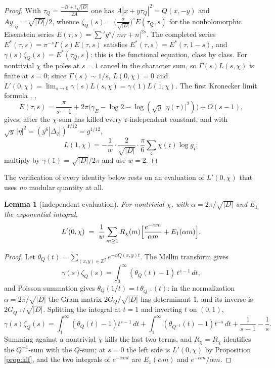 \documentclass[11pt]{amsart}
\numberwithin{equation}{section}
\theoremstyle{plain}
\newtheorem{lemma}[theorem]{Lemma}
\theoremstyle{definition}
\theoremstyle{remark}
\newcommand{\Z}{\mathbb{Z}}
\newcommand{\idealc}{\mathfrak{c}}
\begin{document}
\begin{proof}
With $\tau_Q = \tfrac{-B + i\sqrt{|D|}}{2A}$ one has $A|x + y\tau_Q|^2 =
Q(x,-y)$ and $Ay_{\tau_Q} = \sqrt{|D|}/2$, whence
$\zeta_Q(s) = \bigl(\tfrac{2}{\sqrt{|D|}}\bigr)^{s}E(\tau_Q, s)$ for the
nonholomorphic Eisenstein series $E(\tau,s) = \sum'y^s/|m\tau + n|^{2s}$.
The completed series $E^*(\tau,s) = \pi^{-s}\Gamma(s)E(\tau,s)$ satisfies
$E^*(\tau,s) = E^*(\tau,1-s)$, and $\gamma(s)\zeta_Q(s) = E^*(\tau_Q,s)$:
this is the functional equation, class by class.  For nontrivial $\chi$
the poles at $s = 1$ cancel in the character sum, so $\Gamma(s)L(s,\chi)$
is finite at $s = 0$; since $\Gamma(s) \sim 1/s$, $L(0,\chi) = 0$ and
$L'(0,\chi) = \lim_{s \to 0}\gamma(s)L(s,\chi) = \gamma(1)L(1,\chi)$.  The
first Kronecker limit formula \cite[Ch.~I]{Siegel1961}, \cite[Ch.~20]{Lang1987},
\[
  E(\tau,s) = \frac{\pi}{s-1} + 2\pi\bigl(\gamma_E - \log 2 -
  \log(\sqrt y\,|\eta(\tau)|^2)\bigr) + O(s-1),
\]
gives, after the $\chi$-sum has killed every $\idealc$-independent
constant, and with $\sqrt y\,|\eta|^2 = (y^6|\Delta_q|)^{1/12} =
g^{1/12}$,
\[
  L(1,\chi) = -\frac1w\cdot\frac{2}{\sqrt{|D|}}\cdot\frac{\pi}{6}
  \sum_\idealc\chi(\idealc)\log g_\idealc ;
\]
multiply by $\gamma(1) = \sqrt{|D|}/2\pi$ and use $w = 2$.
\end{proof}

The verification of every identity below rests on an evaluation of
$L'(0,\chi)$ that uses \emph{no} modular quantity at all.

\begin{lemma}[independent evaluation]\label{lem:gamma-eval}
For nontrivial $\chi$, with $\alpha = 2\pi/\sqrt{|D|}$ and $E_1$ the
exponential integral,
\[
  L'(0,\chi) \;=\; \frac1w\sum_{m \ge 1}R_\chi(m)\Bigl[\frac{e^{-\alpha m}}
  {\alpha m} + E_1(\alpha m)\Bigr] .
\]
\end{lemma}

\begin{proof}
Let $\theta_Q(t) = \sum_{(x,y)\in\Z^2}e^{-\alpha Q(x,y)t}$.  The Mellin
transform gives
\[
  \gamma(s)\zeta_Q(s) = \int_0^\infty(\theta_Q(t) - 1)\,t^{s-1}\,dt,
\]
and Poisson summation gives $\theta_Q(1/t) = t\,
\theta_{Q^{-1}}(t)$: in the normalization $\alpha = 2\pi/\sqrt{|D|}$ the
Gram matrix $2G_Q/\sqrt{|D|}$ has determinant $1$, and its inverse is
$2G_{Q^{-1}}/\sqrt{|D|}$.  Splitting the integral at $t = 1$ and
inverting $t$ on $(0,1)$,
\[
  \gamma(s)\zeta_Q(s) = \int_1^\infty(\theta_Q(t) - 1)t^{s-1}\,dt
  + \int_1^\infty(\theta_{Q^{-1}}(t) - 1)t^{-s}\,dt + \frac1{s-1} -
  \frac1s .
\]
Summing against a nontrivial $\chi$ kills the last two terms, and
$R_\chi = R_{\bar\chi}$ identifies the $Q^{-1}$-sum with the $Q$-sum;
at $s = 0$ the left side is $L'(0,\chi)$ by Proposition \ref{prop:klf},
and the two integrals of $e^{-\alpha mt}$ are $E_1(\alpha m)$ and
$e^{-\alpha m}/\alpha m$.
\end{proof}
\end{document}
